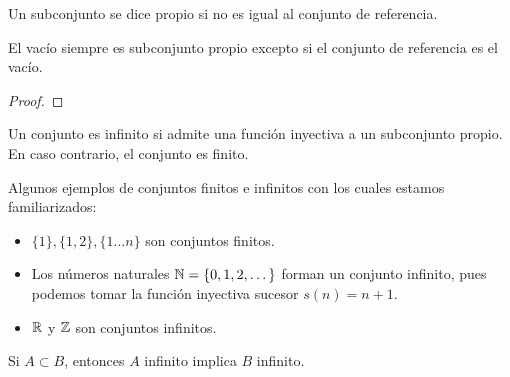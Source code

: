 \documentclass[main.tex]{subfiles}
\begin{document}
\begin{defn}
    Un subconjunto se dice propio si no es igual al conjunto de referencia.
\end{defn}

\begin{theorem}
    El vac\'io siempre es subconjunto propio excepto si el conjunto de referencia es el vac\'io.
\end{theorem}

\begin{proof}
    
\end{proof}

\begin{defn}
    Un conjunto es infinito si admite una funci\'on inyectiva a un subconjunto propio. En caso contrario, el conjunto es finito.
\end{defn}

\begin{example}
    Algunos ejemplos de conjuntos finitos e infinitos con los cuales estamos familiarizados:
    \begin{itemize}
        \item $\{1\}, \{1, 2\}, \{1 \dots n\}$ son conjuntos finitos.
        \item Los n\'umeros naturales $\mathbb N = \{0, 1, 2, \dots\}$ forman un conjunto infinito, pues podemos tomar la funci\'on inyectiva sucesor $s(n) = n + 1$.
        \item $\mathbb R$ y $\mathbb Z$ son conjuntos infinitos.
    \end{itemize}
\end{example}

\begin{theorem}
    Si $A \subset B$, entonces $A$ infinito implica $B$ infinito.
\end{theorem}
\end{document}
